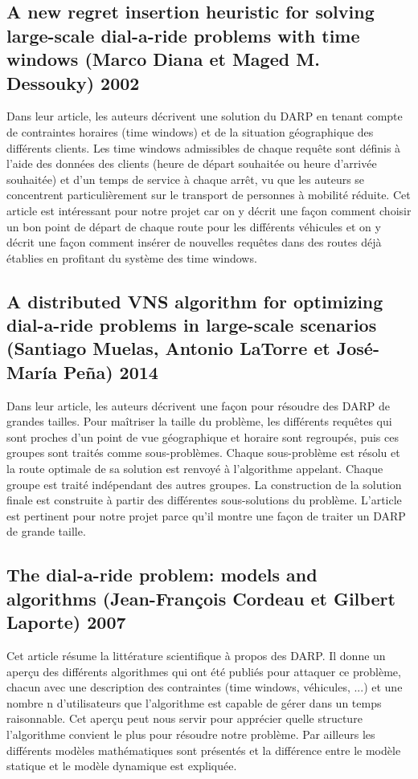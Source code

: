 \documentclass[10pt,a4paper]{report}
\begin{document}
\subsection*{A new regret insertion heuristic for solving large-scale dial-a-ride problems with time windows (Marco Diana et Maged M. Dessouky) 2002} 
 Dans leur article, les auteurs décrivent une solution du DARP en tenant compte de contraintes horaires (time windows) et de la situation géographique des différents clients. Les time windows admissibles de chaque requête sont définis à l'aide des données des clients (heure de départ souhaitée ou heure d'arrivée souhaitée) et d'un temps de service à chaque arrêt, vu que les auteurs se concentrent particulièrement sur le transport de personnes à mobilité réduite. Cet article est intéressant pour notre projet car on y décrit une façon comment choisir un bon point de départ de chaque route pour les différents véhicules et on y décrit une façon comment insérer de nouvelles requêtes dans des routes déjà établies en profitant du système des time windows.
\subsection*{A distributed VNS algorithm for optimizing dial-a-ride problems in large-scale scenarios (Santiago Muelas, Antonio LaTorre et José-María Peña) 2014}
Dans leur article, les auteurs décrivent une façon pour résoudre des DARP de grandes tailles. Pour maîtriser la taille du problème, les différents requêtes qui sont proches d'un point de vue géographique et horaire sont regroupés, puis ces groupes sont traités comme sous-problèmes. Chaque sous-problème est résolu et la route optimale de sa solution est renvoyé à l'algorithme appelant. Chaque groupe est traité indépendant des autres groupes. La construction de la solution finale est construite à partir des différentes sous-solutions du problème. L'article est pertinent pour notre projet parce qu'il montre une façon de traiter un DARP de grande taille.
\subsection*{The dial-a-ride problem: models and algorithms (Jean-François Cordeau et Gilbert Laporte) 2007}
Cet article résume la littérature scientifique à propos des DARP. Il donne un aperçu des différents algorithmes qui ont été publiés pour attaquer ce problème, chacun avec une description des contraintes (time windows, véhicules, ...) et une nombre n d'utilisateurs que l'algorithme est capable de gérer dans un temps raisonnable. Cet aperçu peut nous servir pour apprécier quelle structure l'algorithme convient le plus pour résoudre notre problème. Par ailleurs les différents modèles mathématiques sont présentés et la différence entre le modèle statique et le modèle dynamique est expliquée.
\end{document}
